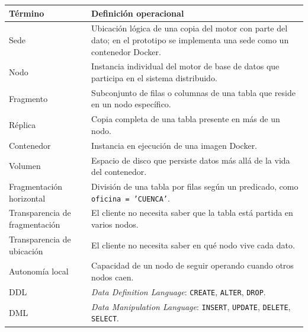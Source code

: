 \documentclass[11pt,a4paper]{article}
\begin{document}
\begin{xltabular}{\textwidth}{@{}p{3.5cm}X@{}}
\toprule
\textbf{T\'ermino} & \textbf{Definici\'on operacional} \\
\midrule
Sede         & Ubicaci\'on l\'ogica de una copia del motor con parte del dato; en el prototipo se implementa una sede como un contenedor Docker. \\
Nodo         & Instancia individual del motor de base de datos que participa en el sistema distribuido. \\
Fragmento    & Subconjunto de filas o columnas de una tabla que reside en un nodo espec\'ifico. \\
R\'eplica    & Copia completa de una tabla presente en m\'as de un nodo. \\
Contenedor   & Instancia en ejecuci\'on de una imagen Docker. \\
Volumen      & Espacio de disco que persiste datos m\'as all\'a de la vida del contenedor. \\
Fragmentaci\'on horizontal & Divisi\'on de una tabla por filas seg\'un un predicado, como \texttt{oficina~=~'CUENCA'}. \\
Transparencia de fragmentaci\'on & El cliente no necesita saber que la tabla est\'a partida en varios nodos. \\
Transparencia de ubicaci\'on & El cliente no necesita saber en qu\'e nodo vive cada dato. \\
Autonom\'ia local & Capacidad de un nodo de seguir operando cuando otros nodos caen. \\
DDL          & \emph{Data Definition Language}: \texttt{CREATE}, \texttt{ALTER}, \texttt{DROP}. \\
DML          & \emph{Data Manipulation Language}: \texttt{INSERT}, \texttt{UPDATE}, \texttt{DELETE}, \texttt{SELECT}. \\
\bottomrule
\end{xltabular}



\end{document}
